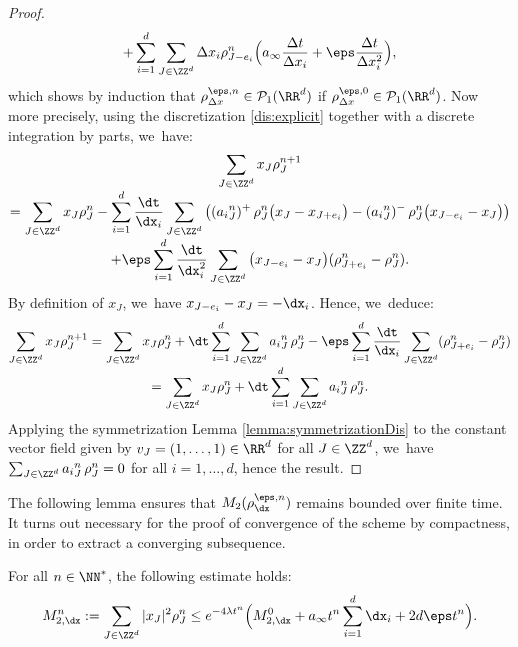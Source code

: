 \begin{proof}
\begin{multline*}
+ \sum_{i = 1}^d \sum_{J\in \ZZ^d} \Delta x_i\rho_{J - e_i}^{n} \Bigl(a_\infty \frac{\Delta t}{\Delta x_i} + \eps \frac{\Delta t}{\Delta x_i^2}\Bigr),
\end{multline*}
which shows by induction that $\rho_{\Delta x}^{\eps,n} \in \mathcal{P}_1(\RR^d)$ if $\rho_{\Delta x}^{\eps,0} \in \mathcal{P}_1(\RR^d)$.
Now more precisely, using the discretization \eqref{dis:explicit} together with a discrete integration by parts, we~have:\vspace*{-5pt}
\begin{multline*}
\sum_{J\in \ZZ^d} x_J\rho_{J}^{n+1} \\[-3pt]
= \sum_{J\in
\ZZ^d} x_J\rho_{J}^n 
- \sum_{i=1}^d\frac{\dt}{\dx_i} \sum_{J\in
\ZZ^d} \left(({a_i}^n_{J})^+ \, \rho_{J}^n \big(x_J-x_{J+e_i}\big)
-({a_i}^n_{J})^- \, \rho_{J}^n \big(x_{J-e_i}-x_J\big) \right) \\[-3pt]
+ \eps\sum_{i=1}^d\frac{\dt}{\dx_i^2} \sum_{J\in
\ZZ^d} \big(x_{J-e_i}-x_J\big)(\rho_{J+e_i}^n - \rho_{J}^n).
\end{multline*}
By definition of $x_J$, we~have $x_{J-e_i}-x_J = -\dx_i$. Hence, we~deduce:\vspace*{-5pt}
\begin{multline*}
\sum_{J\in \ZZ^d} x_J\rho_{J}^{n+1} = \sum_{J\in \ZZ^d}
x_J\rho_{J}^n + \dt \sum_{i=1}^d \sum_{J\in \ZZ^d} {a_i}^n_{J} \, \rho_{J}^n - \eps\sum_{i=1}^d\frac{\dt}{\dx_i} \sum_{J\in
\ZZ^d}(\rho_{J+e_i}^n - \rho_{J}^n) \\[-3pt]
= \sum_{J\in \ZZ^d}
x_J\rho_{J}^n + \dt \sum_{i=1}^d \sum_{J\in \ZZ^d} {a_i}^n_{J} \, \rho_{J}^n.
\end{multline*}
Applying the symmetrization Lemma \ref{lemma:symmetrizationDis} to the constant vector field given by $v_J = (1, \ldots, 1) \in \RR^d$ for all $J \in \ZZ^d$, we~have $\sum_{J\in \ZZ^d} {a_i}^n_{J} \, \rho_{J}^n = 0$ for all $i=1,\ldots,d$, hence the result.
\end{proof}
The following lemma ensures that $M_2(\rho_{\dx}^{\eps,n})$ remains bounded over finite time. It turns out necessary for the proof of convergence of the scheme by compactness, in order to extract a converging subsequence.
\begin{lemma}\label{bounddismom}
For all $n\in \NN^*$, the following estimate holds:\vspace*{-3pt}
\begin{equation*}
M_{2,\dx}^n := \sum_{J\in \ZZ^d} |x_J|^2\rho_{J}^n \leq e^{-4 \lambda t^n} \Big(M_{2,\dx}^0 + a_\infty t^n \sum_{i=1}^d \dx_i + 2d\eps t^n\Big).
\end{equation*}
\end{lemma}

